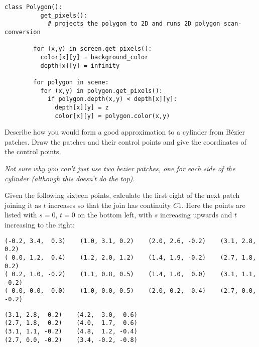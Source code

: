 \documentclass{supervision}
\begin{document}
\begin{questions}
\begin{solution}
\begin{lstlisting}[gobble=8]
        class Polygon():
          get_pixels():
            # projects the polygon to 2D and runs 2D polygon scan-conversion

        for (x,y) in screen.get_pixels():
          color[x][y] = background_color
          depth[x][y] = infinity

        for polygon in scene:
          for (x,y) in polygon.get_pixels():
            if polygon.depth(x,y) < depth[x][y]:
              depth[x][y] = z
              color[x][y] = polygon.color(x,y)
      \end{lstlisting}

    \end{solution}

  \question Describe how you would form a good approximation to a cylinder
    from Bézier patches. Draw the patches and their control points and give
    the coordinates of the control points.
    \begin{solution}
      \emph{Not sure why you can't just use two bezier patches, one for each
      side of the cylinder (although this doesn't do the top).}
    \end{solution}

  \question Given the following sixteen points, calculate the first eight of
    the next patch joining it as $t$ increases so that the join has continuity
    $C1$. Here the points are listed with $s=0$, $t=0$ on the bottom left,
    with $s$ increasing upwards and $t$ increasing to the right:
    \begin{Verbatim}[fontsize=\scriptsize]
(-0.2, 3.4,  0.3)    (1.0, 3.1, 0.2)    (2.0, 2.6, -0.2)    (3.1, 2.8,  0.2)
( 0.0, 1.2,  0.4)    (1.2, 2.0, 1.2)    (1.4, 1.9, -0.2)    (2.7, 1.8,  0.2)
( 0.2, 1.0, -0.2)    (1.1, 0.8, 0.5)    (1.4, 1.0,  0.0)    (3.1, 1.1, -0.2)
( 0.0, 0.0,  0.0)    (1.0, 0.0, 0.5)    (2.0, 0.2,  0.4)    (2.7, 0.0, -0.2)
    \end{Verbatim}
    \begin{solution}
      \begin{Verbatim}[fontsize=\scriptsize]
(3.1, 2.8,  0.2)    (4.2,  3.0,  0.6)
(2.7, 1.8,  0.2)    (4.0,  1.7,  0.6)
(3.1, 1.1, -0.2)    (4.8,  1.2, -0.4)
(2.7, 0.0, -0.2)    (3.4, -0.2, -0.8)
      \end{Verbatim}
    \end{solution}
\end{questions}

\section*{\Topics}
\end{document}
